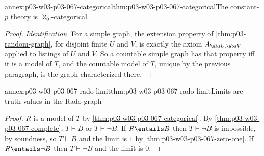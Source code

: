 \begin{annexitem}{annex:p03-w03-p03-067-categorical}{thm:p03-w03-p03-067-categorical}{The constant-\(p\) theory is \(\aleph_0\)-categorical}
\begin{proof}
\emph{Identification.}  For a simple graph, the extension property of
\cref{thm:p03-random-graph}, for disjoint finite \(U\) and \(V\), is exactly
the axiom \(A_{\abs U,\abs V}\) applied to listings of \(U\) and \(V\).  So a
countable simple graph has that property iff it is a model of \(T\), and the
countable model of \(T\), unique by the previous paragraph, is the graph
characterized there.
\end{proof}
\end{annexitem}

\begin{annexitem}{annex:p03-w03-p03-067-rado-limit}{thm:p03-w03-p03-067-rado-limit}{Limits are truth values in the Rado graph}
\begin{proof}
\(R\) is a model of \(T\) by \cref{thm:p03-w03-p03-067-categorical}.  By
\cref{thm:p03-w03-p03-067-complete}, \(T\vdash B\) or \(T\vdash\neg B\).  If
\(R\entails B\) then \(T\vdash\neg B\) is impossible, by soundness, so
\(T\vdash B\) and the limit is \(1\) by
\cref{thm:p03-w03-p03-067-zero-one}.  If \(R\entails\neg B\) then
\(T\vdash\neg B\) and the limit is \(0\).
\end{proof}
\end{annexitem}

